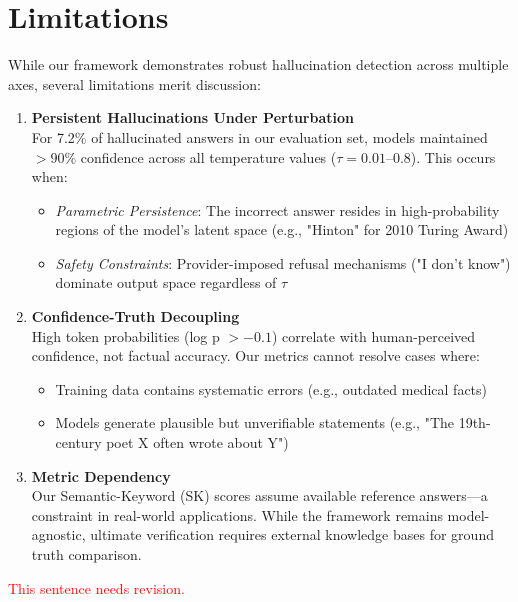 \documentclass[sigconf]{acmart}
\newcommand{\collab}[1]{\textcolor{red}{#1}}
\begin{document}
\section{Limitations}

While our framework demonstrates robust hallucination detection across multiple axes, several limitations merit discussion:

\begin{enumerate}
    \item \textbf{Persistent Hallucinations Under Perturbation}\\
    For 7.2\% of hallucinated answers in our evaluation set, models maintained $>90\%$ confidence across all temperature values ($\tau = 0.01$--$0.8$). This occurs when:
    \begin{itemize}
        \item \textit{Parametric Persistence}: The incorrect answer resides in high-probability regions of the model's latent space (e.g., "Hinton" for 2010 Turing Award)
        \item \textit{Safety Constraints}: Provider-imposed refusal mechanisms ("I don't know") dominate output space regardless of $\tau$
    \end{itemize}
    
    \item \textbf{Confidence-Truth Decoupling}\\
    High token probabilities (log p $> -0.1$) correlate with human-perceived confidence, not factual accuracy. Our metrics cannot resolve cases where:
    \begin{itemize}
        \item Training data contains systematic errors (e.g., outdated medical facts)
        \item Models generate plausible but unverifiable statements (e.g., "The 19th-century poet X often wrote about Y")
    \end{itemize}
    
    \item \textbf{Metric Dependency}\\
    Our Semantic-Keyword (SK) scores assume available reference answers—a constraint in real-world applications. While the framework remains model-agnostic, ultimate verification requires external knowledge bases for ground truth comparison.
\end{enumerate}

\collab{This sentence needs revision.}



\end{document}
